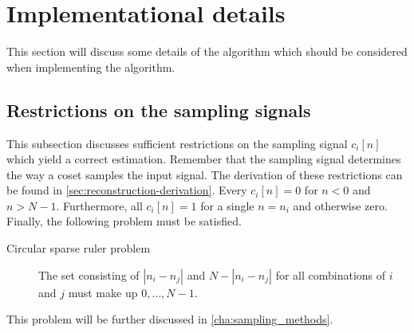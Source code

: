 \documentclass[a4paper, openany, oneside]{memoir}
\begin{document}
\section{Implementational details}
\label{sec:reconstruction-implementation}
This section will discuss some details of the algorithm which should be considered when implementing the algorithm.

\subsection{Restrictions on the sampling signals}
\label{sub:reconstruction-ci}
This subsection discusses sufficient restrictions on the sampling signal $c_i[n]$ which yield a correct estimation. Remember that the sampling signal determines the way a coset samples the input signal. The derivation of these restrictions can be found in \cref{sec:reconstruction-derivation}. Every $c_i[n]=0$ for $n < 0$ and $n > N-1$. Furthermore, all $c_i[n]=1$ for a single $n=n_i$ and otherwise zero. Finally, the following problem must be satisfied.

\begin{description}
    \item[Circular sparse ruler problem] The set consisting of $|n_i - n_j|$ and $N-|n_i-n_j|$ for all combinations of $i$ and $j$ must make up $0,\ldots,N-1$.
\end{description}

This problem will be further discussed in \cref{cha:sampling_methods}.
\end{document}

